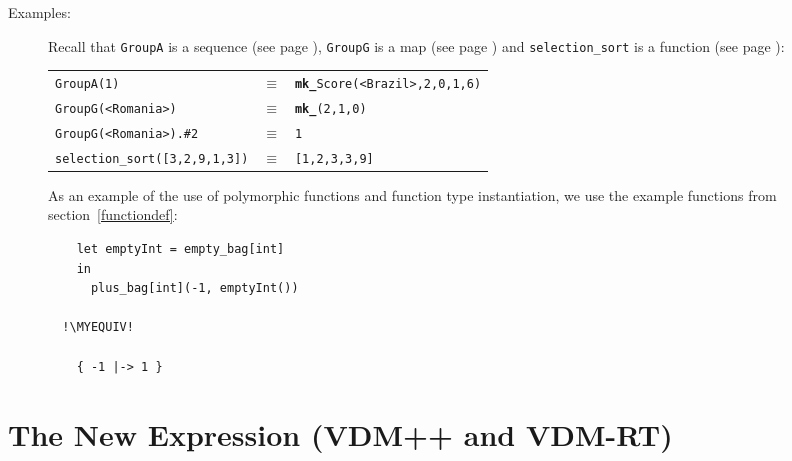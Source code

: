 \documentclass{overturerepchap}
\newcommand{\MYEQUIV}{$\equiv$}
\newcommand{\keyw}[1]{{\bf\ttfamily #1}}
\begin{document}
\begin{description}
\item[Examples:] Recall that \texttt{GroupA} is a sequence (see page 
  \pageref{GroupAdef}), \texttt{GroupG} is a map (see page \pageref{GroupGdef}) 
  and \texttt{selection\_sort} is a function (see page \pageref{selectionSortdef}):

  \begin{tabular}{lcl}
  \texttt{GroupA(1)} & $\equiv$ & 
                           \texttt{\keyw{mk\_}Score(<Brazil>,2,0,1,6)}\\
  \texttt{GroupG(<Romania>)} & $\equiv$ &
                           \texttt{\keyw{mk\_}(2,1,0)}\\
  \texttt{GroupG(<Romania>).\#2} & $\equiv$ &
                           \texttt{1}\\
  \texttt{selection\_sort([3,2,9,1,3])} & $\equiv$ &
                           \texttt{[1,2,3,3,9]}
  \end{tabular}

  As an example of the use of polymorphic functions and function type
  instantiation, we use the example functions from
  section~\ref{functiondef}:
  \begin{lstlisting}
    let emptyInt = empty_bag[int] 
    in
      plus_bag[int](-1, emptyInt())

  !\MYEQUIV!

    { -1 |-> 1 }
  \end{lstlisting}

\end{description}

\section{The New Expression (VDM++ and VDM-RT)}
\label{sec:creation}
\end{document}
